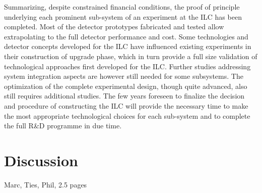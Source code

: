 \documentclass[%
 reprint,
 amsmath,amssymb,
 aps,
]{revtex4-1}
\begin{document}
Summarizing, despite constrained ﬁnancial conditions, the proof of principle underlying each prominent sub-system of an experiment at the ILC has been completed. Most of the detector prototypes fabricated and tested allow extrapolating to the full detector performance and cost. Some technologies and detector concepts developed for the ILC have influenced existing experiments in their construction of upgrade phase, which in turn provide a full size validation of technological approaches ﬁrst developed for the ILC. Further studies addressing system integration aspects are however still needed for some subsystems. The optimization of the complete experimental design, though quite advanced, also still requires additional studies. The few years foreseen to finalize the decision and procedure of constructing the ILC will provide the necessary time to make the most appropriate technological choices for each sub-system and to complete the full R&D programme in due time.

\section{\label{sec:discussion}Discussion}

Marc, Ties, Phil, 2.5 pages
\end{document}
